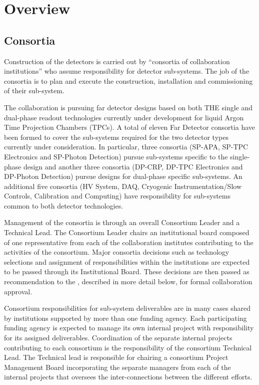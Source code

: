 \chapter{Overview}
\label{vl:tc-overview}

\section{Consortia}
\label{sec:consortia}

Construction of the  detectors is carried out by
``consortia of collaboration institutions'' who assume responsibility
for detector sub-systems.  The job of the consortia is to plan and
execute the construction, installation and commissioning of their
sub-system.

The  collaboration is pursuing far detector designs based on both
THE single and dual-phase readout technologies currently under
development for liquid Argon Time Projection Chambers (TPCs).  A total
of eleven Far Detector consortia have been formed to cover the
sub-systems required for the two detector types currently under
consideration.  In particular, three consortia (SP-APA, SP-TPC
Electronics and SP-Photon Detection) pursue sub-systems specific to
the single-phase design and another three consortia (DP-CRP, DP-TPC
Electronics and DP-Photon Detection) pursue designs for dual-phase
specific sub-systems.  An additional five consortia (HV System, DAQ,
Cryogenic Instrumentation/Slow Controls, Calibration and Computing)
have responsibility for sub-systems common to both detector
technologies.

Management of the consortia is through an overall Consortium Leader
and a Technical Lead.  The Consortium Leader chairs an institutional
board composed of one representative from each of the collaboration
institutes contributing to the activities of the consortium.  Major
consortia decisions such as technology selections and assignment of
responsibilities within the institutions are expected to be passed
through its Institutional Board.  These decisions are then passed as
recommendation to the  , described in more detail
below, for formal collaboration approval.

Consortium responsibilities for sub-system deliverables are in many
cases shared by institutions supported by more than one funding
agency.  Each participating funding agency is expected to manage its
own internal project with responsibility for its assigned
deliverables.  Coordination of the separate internal projects
contributing to each consortium is the responsibility of the
consortium Technical Lead.  The Technical lead is responsible for
chairing a consortium Project Management Board incorporating the
separate managers from each of the internal projects that oversees the
inter-connections between the different efforts.

